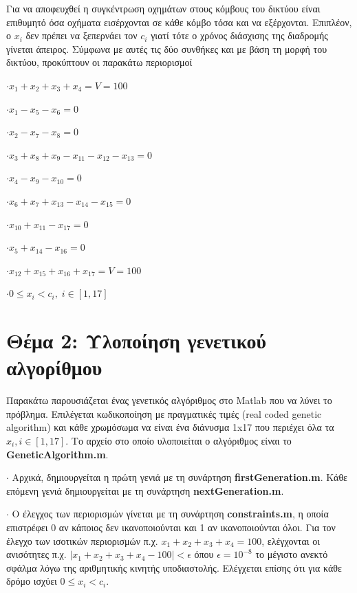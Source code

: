 \documentclass[11pt,a4paper,onecolumn,final]{article}
\begin{document}
{{{\begin{flushleft}
\vspace{0.4cm}

Για να αποφευχθεί η συγκέντρωση οχημάτων στους κόμβους του δικτύου είναι επιθυμητό όσα οχήματα εισέρχονται σε κάθε κόμβο τόσα και να εξέρχονται. Επιπλέον, ο \(x_{i}\) δεν πρέπει να ξεπερνάει τον \(c_{i}\) γιατί τότε ο χρόνος διάσχισης της διαδρομής γίνεται άπειρος. Σύμφωνα με αυτές τις δύο συνθήκες και με βάση τη μορφή του δικτύου, προκύπτουν οι παρακάτω περιορισμοί  

\(\cdot x_{1}+x_{2}+x_{3}+x_{4}=V=100\)

\(\cdot x_{1}-x_{5}-x_{6}= 0\)

\(\cdot x_{2}-x_{7}-x_{8}=0\)

\(\cdot x_{3}+x_{8}+x_{9}-x_{11}-x_{12}-x_{13}=0\)

\(\cdot x_{4}-x_{9}-x_{10}=0\)

\(\cdot x_{6}+x_{7}+x_{13}-x_{14}-x_{15}=0\)

\(\cdot x_{10}+x_{11}-x_{17}=0\)

\(\cdot x_{5}+x_{14}-x_{16}=0\)

\(\cdot x_{12}+x_{15}+x_{16}+x_{17}=V=100\)

\(\cdot 0 \leq x_{i} < c_{i}, \; i \in [1, 17]\)

\newpage

\section{Θέμα 2: Υλοποίηση γενετικού αλγορίθμου}

Παρακάτω παρουσιάζεται ένας γενετικός αλγόριθμος στο Matlab που να λύνει το πρόβλημα. Επιλέγεται κωδικοποίηση με πραγματικές τιμές (real coded genetic algorithm) και κάθε χρωμόσωμα να είναι ένα διάνυσμα 1x17 που περιέχει όλα τα \(x_{i}, i \in [1, 17]\). Το αρχείο στο οποίο υλοποιείται ο αλγόριθμος είναι το \textbf{GeneticAlgorithm.m}.  

\vspace{0.4cm}

\(\cdot\) Αρχικά, δημιουργείται η πρώτη γενιά με τη συνάρτηση \textbf{firstGeneration.m}. Κάθε επόμενη γενιά δημιουργείται με τη συνάρτηση \textbf{nextGeneration.m}.

\vspace{0.4cm}

\(\cdot\) Ο έλεγχος των περιορισμών γίνεται με τη συνάρτηση \textbf{constraints.m}, η οποία επιστρέφει 0 αν κάποιος δεν ικανοποιούνται και 1 αν ικανοποιούνται όλοι. Για τον έλεγχο των ισοτικών περιορισμών π.χ. \(x_{1}+x_{2}+x_{3}+x_{4}=100\), ελέγχονται οι ανισότητες π.χ. \(|x_{1}+x_{2}+x_{3}+x_{4}-100| < \epsilon\) όπου \(\epsilon = 10^{-8}\) το μέγιστο ανεκτό σφάλμα λόγω της αριθμητικής κινητής υποδιαστολής. Ελέγχεται επίσης ότι για κάθε δρόμο ισχύει \(0 \leq x_{i} < c_{i}\).


\end{flushleft}}}}
\end{document}
